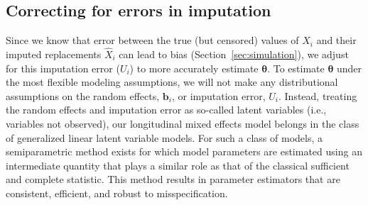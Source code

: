 \documentclass[12pt]{article}
\def\bzero{{\mathbf 0}}
\def\btheta{{\boldsymbol{\theta}}}
\def\bzero{{\boldsymbol{0}}}
\def\bb{{\boldsymbol b}}
\begin{document}
\subsection{Correcting for errors in imputation}
\label{sec:Hilbert-space-stuff}
Since we know that error between the true (but censored) values of $X_i$ and their imputed replacements $\widehat{X}_i$ can lead to bias (Section~\ref{sec:simulation}), we adjust for this imputation error ($U_i$) to more accurately estimate $\btheta$. %
To estimate $\btheta$  under the most flexible modeling assumptions, we will not make any distributional assumptions on the random effects, $\bb_i$, or imputation error, $U_i$. Instead, treating the random effects and imputation error as so-called latent variables (i.e., variables not observed), our longitudinal mixed effects model belongs in the class of generalized linear latent variable models. For such a class of models, a semiparametric method exists \citep{garcia2016optimal} for which model parameters are estimated using an intermediate quantity that plays a similar role as that of the classical sufficient and complete statistic.
This method results in parameter estimators that are consistent, efficient, and robust to misspecification. 

\end{document}
